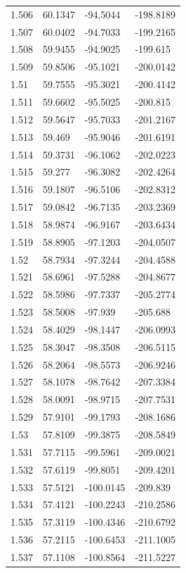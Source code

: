 \begin{tabular}{llll}
1.506 & 60.1347 & -94.5044 & -198.8189 \\
1.507 & 60.0402 & -94.7033 & -199.2165 \\
1.508 & 59.9455 & -94.9025 & -199.615 \\
1.509 & 59.8506 & -95.1021 & -200.0142 \\
1.51 & 59.7555 & -95.3021 & -200.4142 \\
1.511 & 59.6602 & -95.5025 & -200.815 \\
1.512 & 59.5647 & -95.7033 & -201.2167 \\
1.513 & 59.469 & -95.9046 & -201.6191 \\
1.514 & 59.3731 & -96.1062 & -202.0223 \\
1.515 & 59.277 & -96.3082 & -202.4264 \\
1.516 & 59.1807 & -96.5106 & -202.8312 \\
1.517 & 59.0842 & -96.7135 & -203.2369 \\
1.518 & 58.9874 & -96.9167 & -203.6434 \\
1.519 & 58.8905 & -97.1203 & -204.0507 \\
1.52 & 58.7934 & -97.3244 & -204.4588 \\
1.521 & 58.6961 & -97.5288 & -204.8677 \\
1.522 & 58.5986 & -97.7337 & -205.2774 \\
1.523 & 58.5008 & -97.939 & -205.688 \\
1.524 & 58.4029 & -98.1447 & -206.0993 \\
1.525 & 58.3047 & -98.3508 & -206.5115 \\
1.526 & 58.2064 & -98.5573 & -206.9246 \\
1.527 & 58.1078 & -98.7642 & -207.3384 \\
1.528 & 58.0091 & -98.9715 & -207.7531 \\
1.529 & 57.9101 & -99.1793 & -208.1686 \\
1.53 & 57.8109 & -99.3875 & -208.5849 \\
1.531 & 57.7115 & -99.5961 & -209.0021 \\
1.532 & 57.6119 & -99.8051 & -209.4201 \\
1.533 & 57.5121 & -100.0145 & -209.839 \\
1.534 & 57.4121 & -100.2243 & -210.2586 \\
1.535 & 57.3119 & -100.4346 & -210.6792 \\
1.536 & 57.2115 & -100.6453 & -211.1005 \\
1.537 & 57.1108 & -100.8564 & -211.5227 \\

\end{tabular}
